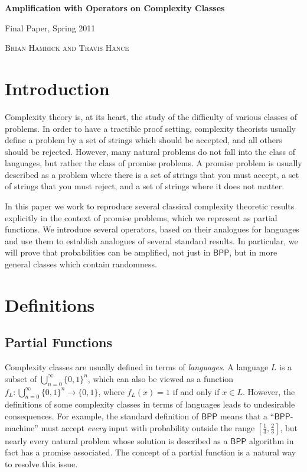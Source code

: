 \documentclass[11pt]{article}
\newcommand{\bpp}{\textsf{BPP}}
\begin{document}
\begin{center} \begin{LARGE} {\sc \bf Amplification with Operators on Complexity Classes} \vspace{6pt}

{ Final Paper, Spring 2011} \vspace{9pt}

\end{LARGE} { \Large \textsc{Brian Hamrick and Travis Hance}}

\end{center}

\section{Introduction}

Complexity theory is, at its heart, the study of the difficulty of various classes of problems. In order to have a tractible proof setting, complexity theorists usually define a problem by a set of strings which should be accepted, and all others should be rejected. However, many natural problems do not fall into the class of languages, but rather the class of promise problems. A promise problem is usually described as a problem where there is a set of strings that you must accept, a set of strings that you must reject, and a set of strings where it does not matter.

In this paper we work to reproduce several classical complexity theoretic results explicitly in the context of promise problems, which we represent as partial functions. We introduce several operators, based on their analogues for languages and use them to establish analogues of several standard results. In particular, we will prove that probabilities can be amplified, not just in $\bpp$, but in more general classes which contain randomness.

\section{Definitions}

\subsection{Partial Functions}

Complexity classes are usually defined in terms of \emph{languages}. A language $L$ is a subset of $\bigcup_{n=0}^{\infty}\{0,1\}^n$, which can also be viewed as a function $f_L: \bigcup_{n=0}^{\infty}\{0,1\}^n \to \{0,1\}$, where $f_L(x) = 1$ if and only if $x \in L$. However, the definitions of some complexity classes in terms of languages leads to undesirable consequences. For example, the standard definition of $\bpp$ means that a ``$\bpp$-machine'' must accept \emph{every} input with probability outside the range $[\frac{1}{3},\frac{2}{3}]$, but nearly every natural problem whose solution is described as a $\bpp$ algorithm in fact has a promise associated. The concept of a partial function is a natural way to resolve this issue.
\end{document}

